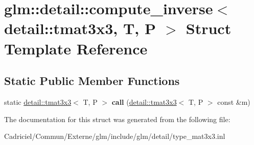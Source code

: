 \hypertarget{structglm_1_1detail_1_1compute__inverse_3_01detail_1_1tmat3x3_00_01_t_00_01_p_01_4}{}\section{glm\+:\+:detail\+:\+:compute\+\_\+inverse$<$ detail\+:\+:tmat3x3, T, P $>$ Struct Template Reference}
\label{structglm_1_1detail_1_1compute__inverse_3_01detail_1_1tmat3x3_00_01_t_00_01_p_01_4}
\subsection*{Static Public Member Functions}
\begin{DoxyCompactItemize}
\item 
static \hyperlink{structglm_1_1detail_1_1tmat3x3}{detail\+::tmat3x3}$<$ T, P $>$ {\bfseries call} (\hyperlink{structglm_1_1detail_1_1tmat3x3}{detail\+::tmat3x3}$<$ T, P $>$ const \&m)\hypertarget{structglm_1_1detail_1_1compute__inverse_3_01detail_1_1tmat3x3_00_01_t_00_01_p_01_4_ac49eb426ffee6a5ebf1ee02e45c0a159}{}\label{structglm_1_1detail_1_1compute__inverse_3_01detail_1_1tmat3x3_00_01_t_00_01_p_01_4_ac49eb426ffee6a5ebf1ee02e45c0a159}

\end{DoxyCompactItemize}


The documentation for this struct was generated from the following file\+:\begin{DoxyCompactItemize}
\item 
Cadriciel/\+Commun/\+Externe/glm/include/glm/detail/type\+\_\+mat3x3.\+inl\end{DoxyCompactItemize}
